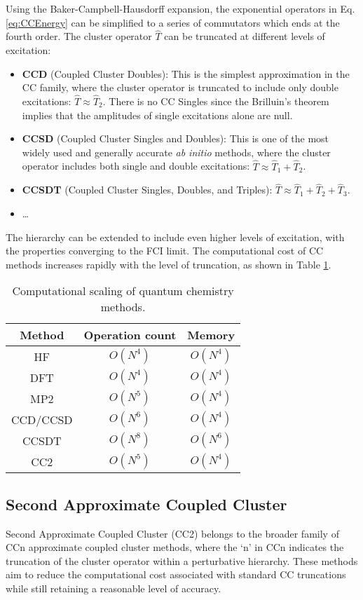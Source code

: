 Using the Baker-Campbell-Hausdorff expansion, the exponential operators in Eq. \ref{eq:CCEnergy} can be simplified to a series of commutators which ends at the fourth order. The cluster operator $\hat{T}$ can be truncated at different levels of excitation:
\begin{itemize}
    \item \textbf{CCD} (Coupled Cluster Doubles): This is the simplest approximation in the CC family, where the cluster operator is truncated to include only double excitations: $\hat{T} \approx \hat{T}_2$. There is no CC Singles since the Brilluin's theorem implies that the amplitudes of single excitations alone are null. 
    \item \textbf{CCSD} (Coupled Cluster Singles and Doubles): This is one of the most widely used and generally accurate \textit{ab initio} methods, where the cluster operator includes both single and double excitations: $\hat{T} \approx \hat{T}_1 + \hat{T}_2$.
    \item \textbf{CCSDT} (Coupled Cluster Singles, Doubles, and Triples): $\hat{T} \approx \hat{T}_1 + \hat{T}_2 + \hat{T}_3$.
    \item \ldots
\end{itemize}
The hierarchy can be extended to include even higher levels of excitation,  with the properties converging to the FCI limit. The computational cost of CC methods increases rapidly with the level of truncation, as shown in Table \ref{tab:qc_scaling}.
\begin{table}[h!]
    \centering
    \begin{tabular}{ccc}
        Method & Operation count & Memory \\
        \hline
        HF & $O(N^4)$ & $O(N^4)$ \\
        DFT & $O(N^4)$ & $O(N^4)$ \\ 
        MP2 & $O(N^5)$ & $O(N^4)$ \\
        CCD/CCSD & $O(N^6)$ & $O(N^4)$ \\
        CCSDT & $O(N^8)$ & $O(N^6)$ \\
        CC2 & $O(N^{5})$ & $O(N^4)$ \\
    \end{tabular}
    \caption{Computational scaling of quantum chemistry methods.}
    \label{tab:qc_scaling}
\end{table}

\subsection{Second Approximate Coupled Cluster}\label{sec:CC2Theory}
Second Approximate Coupled Cluster (CC2) belongs to the broader family of CCn approximate coupled cluster methods, where the `n' in CCn indicates the truncation of the cluster operator within a perturbative hierarchy. These methods aim to reduce the computational cost associated with standard CC truncations while still retaining a reasonable level of accuracy.\\

